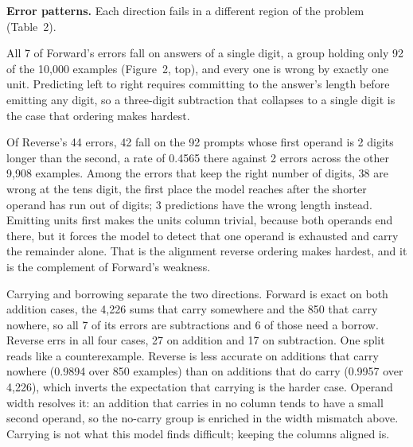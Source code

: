 \documentclass[10pt,a4paper,twocolumn]{article}
\begin{document}
\textbf{Error patterns.} Each direction fails in a different region of the problem (Table~2).

All 7 of Forward's errors fall on answers of a single digit, a group holding only 92 of the 10,000 examples
(Figure~2, top), and every one is wrong by exactly one unit. Predicting left to right requires committing to the answer's length before
emitting any digit, so a three-digit subtraction that collapses to a single digit is the case that
ordering makes hardest.

Of Reverse's 44 errors, 42 fall on the 92
prompts whose first operand is 2 digits longer than the second, a rate of
0.4565 there against 2 errors across the other 9,908
examples. Among the errors that keep the right number of digits, 38 are wrong at
the tens digit, the first place the model reaches after the shorter operand has run out of
digits; 3 predictions have the wrong length instead.
Emitting units first makes the units column trivial, because both operands end there, but it
forces the model to detect that one operand is exhausted and carry the remainder
alone. That is the alignment reverse ordering makes hardest, and it is the complement of Forward's weakness.

Carrying and borrowing separate the two directions. Forward is exact on both addition cases, the 4,226 sums that carry somewhere and the 850 that carry nowhere, so all 7 of its errors are subtractions and 6 of those need a borrow. Reverse errs in all four cases, 27 on addition and 17 on subtraction. One split reads like a counterexample. Reverse is less accurate on additions that carry nowhere (0.9894 over 850 examples) than on additions that do carry (0.9957 over 4,226), which inverts the expectation that carrying is the harder case. Operand width resolves it: an addition that carries in no column tends to have a small second operand, so the no-carry group is enriched in the width mismatch above. Carrying is not what this model finds difficult; keeping the columns aligned is.
\end{document}
